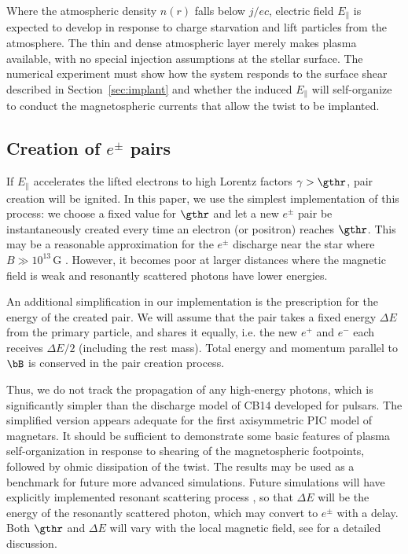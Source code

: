 Where the atmospheric density $n(r)$ falls below $j/ec$, electric field
$E_\parallel$ is expected to develop in response to charge starvation and lift
particles from the atmosphere. The thin and dense atmospheric layer merely makes
plasma available, with no special injection assumptions at the stellar surface.
The numerical experiment must show how the system responds to the surface shear
described in Section~\ref{sec:implant} and whether the induced $E_\parallel$
will self-organize to conduct the magnetospheric currents that allow the twist
to be implanted.

\subsection{Creation of $e^\pm$ pairs}
\label{sec:pairs}

If $E_\parallel$ accelerates the lifted electrons to high Lorentz factors
$\gamma>\gthr$, pair creation will be ignited. In this paper, we use the
simplest implementation of this process: we choose a fixed value for $\gthr$ and
let a new $e^\pm$ pair be instantaneously created every time an electron (or
positron) reaches $\gthr$. This may be a reasonable approximation for the
$e^\pm$ discharge near the star where $B\gg 10^{13}\,\mathrm{G}$
\citep{2013ApJ...762...13B}. However, it becomes poor at larger distances where
the magnetic field is weak and resonantly scattered photons have lower energies.

An additional simplification in our implementation is the
prescription for the energy of the created pair. We will assume that the pair takes a
fixed energy $\Delta E$ from the primary particle, and shares it equally, i.e. the new
$e^+$ and $e^-$ each receives $\Delta E/2$ (including the rest mass).
Total energy and momentum parallel to $\bB$ is conserved in the pair creation process.

Thus, we do not track the propagation of any high-energy photons, which is
significantly simpler than the discharge model of CB14 developed for pulsars.
The simplified version appears adequate for the first axisymmetric PIC model of
magnetars. It should be sufficient to demonstrate some basic features of plasma
self-organization in response to shearing of the magnetospheric footpoints,
followed by ohmic dissipation of the twist. The results may be used as a
benchmark for future more advanced simulations. Future simulations will have
explicitly implemented
resonant scattering process
, so that $\Delta E$ will be the energy of
the resonantly scattered photon, which may convert to $e^\pm$ with a delay. Both
$\gthr$ and $\Delta E$ will vary with the local magnetic field, see
\citet{2013ApJ...762...13B}
for a detailed discussion.


